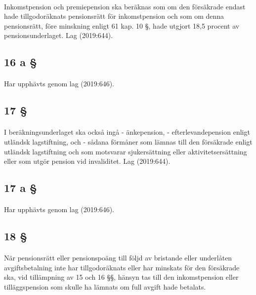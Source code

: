 \documentclass[a4paper,notitlepage,openany,10pt]{book}
\begin{document}
\paragraph*{}
Inkomstpension och premiepension ska beräknas som om den försäkrade endast hade tillgodoräknats pensionsrätt för inkomstpension och som om denna pensionsrätt, före minskning enligt 61 kap. 10 §, hade utgjort 18,5 procent av pensionsunderlaget.
Lag (2019:644).
\subsection*{16 a §}
\paragraph*{}
Har upphävts genom
lag (2019:646).
\subsection*{17 §}
\paragraph*{}
I beräkningsunderlaget ska också ingå
\newline - änkepension,
\newline - efterlevandepension enligt utländsk lagstiftning, och
\newline - sådana förmåner som lämnas till den försäkrade enligt utländsk lagstiftning och som motsvarar sjukersättning eller aktivitetsersättning eller som utgör pension vid invaliditet.
Lag (2019:644).
\subsection*{17 a §}
\paragraph*{}
Har upphävts genom
lag (2019:646).
\subsection*{18 §}
\paragraph*{}
När pensionsrätt eller pensionspoäng till följd av bristande eller underlåten avgiftsbetalning inte har tillgodoräknats eller har minskats för den försäkrade ska, vid tillämpning av 15 och 16 §§, hänsyn tas till den inkomstpension eller tilläggspension som skulle ha lämnats om full avgift hade betalats.
\end{document}
